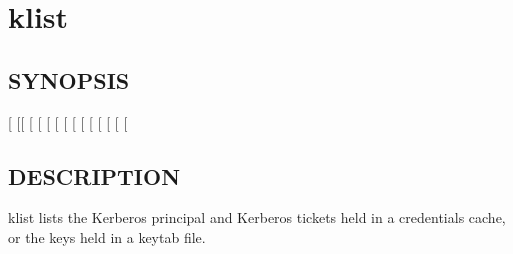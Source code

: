 \documentclass[letterpaper,10pt,english]{sphinxmanual}
\begin{document}
\section{klist}
\label{\detokenize{user/user_commands/klist:klist}}\label{\detokenize{user/user_commands/klist::doc}}\label{\detokenize{user/user_commands/klist:klist-1}}

\subsection{SYNOPSIS}
\label{\detokenize{user/user_commands/klist:synopsis}}
{[}\sphinxstylestrong{-e}{]}
{[}{[}\sphinxstylestrong{-c}{]} {[}\sphinxstylestrong{-l}{]} {[}\sphinxstylestrong{-A}{]} {[}\sphinxstylestrong{-f}{]} {[}\sphinxstylestrong{-s}{]} {[} {[}\sphinxstylestrong{-n}{]}{]}{]}
{[}\sphinxstylestrong{-C}{]}
{[} {[}\sphinxstylestrong{-t}{]} {[}\sphinxstylestrong{-K}{]}{]}
{[}\sphinxstylestrong{-V}{]}
{[}\textbar{}\sphinxstyleemphasis{keytab\_name}{]}


\subsection{DESCRIPTION}
\label{\detokenize{user/user_commands/klist:description}}
klist lists the Kerberos principal and Kerberos tickets held in a
credentials cache, or the keys held in a keytab file.
\end{document}

